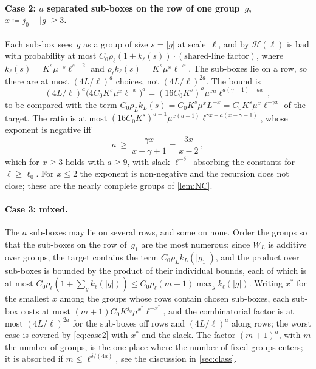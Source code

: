 \documentclass[11pt,letterpaper]{article}
\begin{document}
\paragraph{Case 2: $a$ separated sub-boxes on the row of one group~$g$, $x\coloneqq j_0-\lvert g\rvert\ge3$.} Each sub-box sees~$g$ as a group of size $s=\lvert g\rvert$ at scale~$\ell$, and by $\mathcal H(\ell)$ is bad with probability at most $C_0\rho_\ell(1+k_\ell(s))\cdot(\text{shared-line factor})$, where $k_\ell(s)=K^s\mu^{-s}\ell^{s-2}$ and $\rho_\ell k_\ell(s)=K^s\mu^{x}\ell^{-x}$. The sub-boxes lie on a row, so there are at most $(4L/\ell)^a$ choices, not $(4L/\ell)^{2a}$. The bound is
\begin{equation*}
  (4L/\ell)^a\bigl(4C_0K^s\mu^x\ell^{-x}\bigr)^a=(16C_0K^s)^a\mu^{xa}\ell^{a(\gamma-1)-ax}\,,
\end{equation*}
to be compared with the term $C_0\rho_Lk_L(s)=C_0K^s\mu^xL^{-x}=C_0K^s\mu^x\ell^{-\gamma x}$ of the target. The ratio is at most $(16C_0K^s)^{a-1}\mu^{x(a-1)}\ell^{\gamma x-a(x-\gamma+1)}$, whose exponent is negative iff
\begin{equation}
\label{eq:case2}
  a\ \ge\ \frac{\gamma x}{x-\gamma+1}=\frac{3x}{x-2}\,,
\end{equation}
which for $x\ge3$ holds with $a\ge9$, with slack $\ell^{-\delta'}$ absorbing the constants for $\ell\ge\ell_0$. For $x\le2$ the exponent is non-negative and the recursion does not close; these are the nearly complete groups of \cref{lem:NC}.

\paragraph{Case 3: mixed.} The $a$ sub-boxes may lie on several rows, and some on none. Order the groups so that the sub-boxes on the row of~$g_1$ are the most numerous; since $W_L$ is additive over groups, the target contains the term $C_0\rho_Lk_L(\lvert g_1\rvert)$, and the product over sub-boxes is bounded by the product of their individual bounds, each of which is at most $C_0\rho_\ell(1+\sum_gk_\ell(\lvert g\rvert))\le C_0\rho_\ell(m+1)\max_gk_\ell(\lvert g\rvert)$. Writing $x^*$ for the smallest $x$ among the groups whose rows contain chosen sub-boxes, each sub-box costs at most $(m+1)C_0K^{j_0}\mu^{x^*}\ell^{-x^*}$, and the combinatorial factor is at most $(4L/\ell)^{2a}$ for the sub-boxes off rows and $(4L/\ell)^{a}$ along rows; the worst case is covered by \eqref{eq:case2} with $x^*$ and the slack. The factor $(m+1)^a$, with $m$ the number of groups, is the one place where the number of fixed groups enters; it is absorbed if $m\le\ell^{\delta/(4a)}$, see the discussion in \cref{sec:class}.
\end{document}
